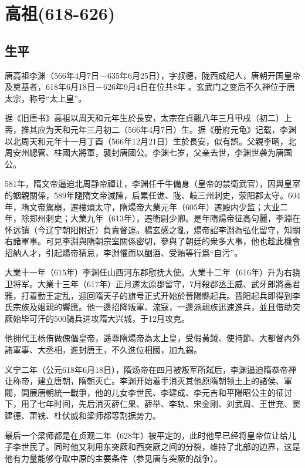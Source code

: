 
\section{高祖\tiny(618-626)}

\subsection{生平}

唐高祖李渊（566年4月7日－635年6月25日），字叔德，陇西成纪人，唐朝开国皇帝及奠基者，618年6月18日－626年9月4日在位共8年 。玄武门之变后不久禅位于唐太宗，称号“太上皇”。

据《旧唐书》高祖以周天和元年生於長安，太宗在貞觀八年三月甲戌（初二）上壽，推其应为天和元年三月初二（566年4月7日）生。据《册府元龟》记载，李渊以北周天和元年十一月丁酉（566年12月21日）生於長安，似有誤。父親李昞，北周安州總管、柱國大將軍，襲封唐國公。李渊七岁，父亲去世，李渊世袭为唐国公。

581年，隋文帝逼迫北周静帝禪让，李渊任千牛備身（皇帝的禁衛武官），因與皇室的姻親關係，589年隨隋文帝滅陳，后累任谯、陇、岐三州刺史，荥阳郡太守。604年，隋文帝駕崩，遷樓煩太守，隋煬帝大業元年（605年）遷殿内少监；大业二年，除郑州刺史；大業九年（613年），遷衛尉少卿。是年隋煬帝征高句麗，李淵在怀远镇（今辽宁朝阳附近）負責督運。楊玄感之亂，煬帝詔李淵為弘化留守，知關右諸軍事。可見李淵與隋朝宗室關係密切，參與了朝廷的衆多大事，他也趁此機會招納人才，引起煬帝猜忌，李淵懼而以酗酒、受賄等行爲“自污”。

大業十一年（615年）李渊任山西河东郡慰抚大使。大業十二年（616年）升为右骁卫将军。大業十三年（617年）正月遷太原郡留守，7月殺郡丞王威、武牙郎將高君雅，打着勤王定乱，迎回隋天子的旗号正式开始於晉陽縣起兵。晋阳起兵即得到李氏宗族及姻親的響應。他一邊招降叛軍、流寇，一邊派親族迅速進兵，並且借助突厥始毕可汗的500骑兵进攻隋大兴城，于12月攻克。

他拥代王杨侑做傀儡皇帝，遥尊隋煬帝為太上皇，受假黃鉞、使持節、大都督內外諸軍事、大丞相，進封唐王，不久進位相國，加九錫。

义宁二年（公元618年6月18日），隋炀帝在四月被叛军所弑后，李渊逼迫隋恭帝禅让称帝，建立唐朝，隋朝灭亡。李渊开始着手消灭其他原隋朝领土上的諸侯、軍閥，開展唐朝統一戰爭，他的儿女李世民、李建成、李元吉和平陽昭公主的征讨下，用了七年时间，先后消灭薛仁果、薛举、李轨、宋金刚、刘武周、王世充、窦建德、萧铣、杜伏威和梁师都等割据势力。

最后一个梁师都是在贞观二年（628年）被平定的，此时他早已经将皇帝位让给儿子李世民了。同时他又利用东突厥和西突厥之间的分裂，维持了北部的边界，这是他有力量能够夺取中原的主要条件（参见唐与突厥的战争）。

